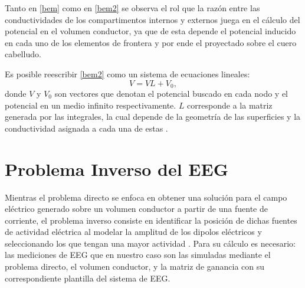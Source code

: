 Tanto en \cref{bem} como en \cref{bem2} se observa el rol que la razón entre las conductividades de los compartimentos internos y externos juega en el cálculo del potencial en el volumen conductor, ya que de esta depende el potencial inducido en cada uno de los elementos de frontera y por ende el proyectado sobre el cuero cabelludo.

Es posible reescribir \cref{bem2} como un sistema de ecuaciones lineales:
\begin{equation}
	\label{lineal}
	V = VL + V_{0},
\end{equation}
donde $V$ y $V_{0}$ son vectores que denotan el potencial buscado en cada nodo y el potencial en un medio infinito respectivamente.
$L$ corresponde a la matriz generada por las integrales, la cual depende de la geometría de las superficies y la conductividad asignada a cada una de estas \cite{Hallez2007}.

\section{Problema Inverso del EEG}
\label{sec:intro:inverse}

Mientras el problema directo se enfoca en obtener una solución para el campo eléctrico generado sobre un volumen conductor a partir de una fuente de corriente, el problema inverso consiste en identificar la posición de dichas fuentes de actividad eléctrica al modelar la amplitud de los dipolos eléctricos y seleccionando los que tengan una mayor actividad \cite{Baillet2001}.
Para su cálculo es necesario: las mediciones de EEG que en nuestro caso son las simuladas mediante el problema directo, el volumen conductor, y la matriz de ganancia con su correspondiente plantilla del sistema de EEG.

